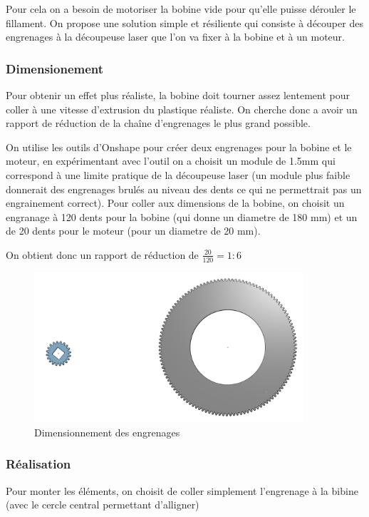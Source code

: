 \documentclass[oneside,a4paper,12pt]{article}
\begin{document}
	Pour cela on a besoin de motoriser la bobine vide pour qu'elle puisse dérouler le fillament. On propose une solution simple et résiliente qui consiste à découper des engrenages à la découpeuse laser que l'on va fixer à la bobine et à un moteur.
	
	\subsubsection{Dimensionement}
	Pour obtenir un effet plus réaliste, la bobine doit tourner assez lentement pour coller à une vitesse d'extrusion du plastique réaliste. On cherche donc a avoir un rapport de réduction de la chaîne d'engrenages le plus grand possible.
	
	On utilise les outils d'Onshape pour créer deux engrenages pour la bobine et le moteur, en expérimentant avec l'outil on a choisit un module de 1.5mm qui correspond à une limite pratique de la découpeuse laser (un module plus faible donnerait des engrenages brulés au niveau des dents ce qui ne permettrait pas un engrainement correct). Pour coller aux dimensions de la bobine, on choisit un engranage à 120 dents pour la bobine (qui donne un diametre de 180 mm) et un de 20 dents pour le moteur (pour un diametre de 20 mm).
	
	On obtient donc un rapport de réduction de $ \frac{20}{120} = 1:6 $
	
	\begin{figure}[h]
		\centering
		\includegraphics[width=10cm]{gears.png}
		\caption{Dimensionnement des engrenages}
	\end{figure}
	
	\newpage
	
	\subsubsection{Réalisation}
	
	Pour monter les éléments, on choisit de coller simplement l'engrenage à la bibine (avec le cercle central permettant d'alligner)
	
\end{document}
